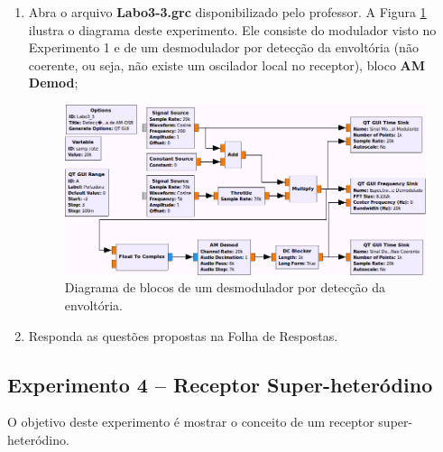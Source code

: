 \documentclass[12pt,addpoints]{exam}
\newcommand{\myscale}{0.4}
\begin{document}
\begin{enumerate}
    \item  Abra o arquivo \textbf{Labo3-3.grc} disponibilizado pelo professor. A Figura \ref{fig:GRC_3-1c} ilustra o diagrama deste experimento. Ele consiste do modulador visto no Experimento 1 e de um desmodulador por detecção da envoltória (não coerente, ou seja, não existe um  oscilador local no receptor), bloco {\bf AM Demod};
    \begin{figure}[htb]
        \centering
        \includegraphics[scale=\myscale]{./Figuras/Labo3-3}
        \caption{Diagrama de blocos de um desmodulador por detecção da envoltória.} 
        \label{fig:GRC_3-1c}
    \end{figure}
  \item Responda as questões propostas na Folha de Respostas.
\end{enumerate}

\subsection{Experimento 4 -- Receptor Super-heteródino}

O objetivo deste experimento é mostrar o conceito de um receptor super-heteródino.
\end{document}
